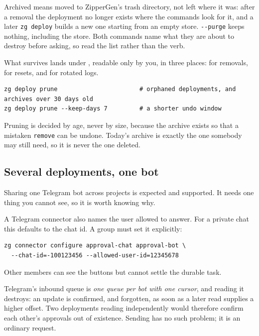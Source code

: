 \documentclass[11pt,a4paper]{article}
\begin{document}
Archived means moved to ZipperGen's trash directory, not left where it was: after a removal the deployment no longer exists where the commands look for it, and a later \texttt{zg deploy} builds a new one starting from an empty store. \texttt{-{}-purge} keeps nothing, including the store. Both commands name what
they are about to destroy before asking, so read the list rather than the verb.

What survives lands under , readable only by you,
in three places:  for removals, 
for resets, and  for rotated logs.

\begin{lstlisting}[style=shell]
zg deploy prune                       # orphaned deployments, and archives over 30 days old
zg deploy prune --keep-days 7         # a shorter undo window
\end{lstlisting}

Pruning is decided by age, never by size, because the archive exists so that a
mistaken \texttt{remove} can be undone. Today's archive is exactly the one
somebody may still need, so it is never the one deleted.

\subsection{Several deployments, one bot}

Sharing one Telegram bot across projects is expected and supported. It needs
one thing you cannot see, so it is worth knowing why.

A Telegram connector also names the user allowed to answer. For a private
chat this defaults to the chat id. A group must set it explicitly:

\begin{lstlisting}[style=shell]
zg connector configure approval-chat approval-bot \
  --chat-id=-100123456 --allowed-user-id=12345678
\end{lstlisting}

Other members can see the buttons but cannot settle the durable task.

Telegram's inbound queue is \emph{one queue per bot with one cursor}, and
reading it destroys: an update is confirmed, and forgotten, as soon as a later
read supplies a higher offset. Two deployments reading independently would
therefore confirm each other's approvals out of existence. Sending has no such
problem; it is an ordinary request.
\end{document}
